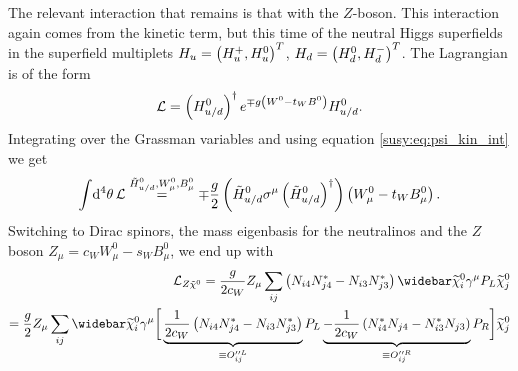 \documentclass[../main.tex]{subfiles}
\begin{document}
\begin{donotread}
  The relevant interaction that remains is that with the \(Z\)-boson. This
  interaction again comes from the kinetic term, but this time of the neutral
  Higgs superfields in the superfield multiplets \(H_u = \left(H_u^+,
    H_u^0\right)^T\), \(H_d = \left(H_d^0, H_d^-\right)^T\). The Lagrangian is of the form
  \begin{equation}
    \mathcal{L} = \left(H_{u/d}^0\right)^\dagger e^{\mp g\left(W^0 - t_W B^0\right)} H_{u/d}^0.
  \end{equation}
  Integrating over the Grassman variables and using equation \cref{susy:eq:psi_kin_int} we get
  \begin{equation}
    \int \!\mathrm{d}^4\theta\, \mathcal{L} \stackrel{\tilde{H}_{u/d}^0, W^0_\mu, B^0_\mu}{=} \mp \frac{g}{2} \left(\tilde{H}_{u/d}^0 \sigma^\mu \left(\tilde{H}_{u/d}^0\right)^\dagger\right)\left(W^0_\mu - t_W B_\mu^0\right).
  \end{equation}
  Switching to Dirac spinors, the mass eigenbasis for the neutralinos and the \(Z\) boson \(Z_\mu = c_W W^0_\mu - s_W B^0_\mu\), we end up with
  \begin{align}
    \nonumber
    \L_{Z \tilde{\chi}^0} = \frac{g}{2c_W} Z_\mu \sum_{ij}\pclosed{N_{i4}N_{j4}^\ast - N_{i3}N_{j3}^\ast} \barnino[i] \gamma^\mu P_L \nino[j] \\
    = \frac{g}{2} Z_\mu \sum_{ij}\barnino[i] \gamma^\mu \bigg[ \underbrace{\frac{1}{2c_W}\pclosed{N_{i4}N_{j4}^\ast - N_{i3}N_{j3}^\ast}}_{\equiv O^{\prime\prime L}_{ij}} P_L \underbrace{-\frac{1}{2c_W}\pclosed{N_{i4}^\ast N_{j4} - N_{i3}^\ast N_{j3}}}_{\equiv O^{\prime\prime R}_{ij}} P_R \bigg] \nino[j]
  \end{align}

\end{donotread}
\end{document}
